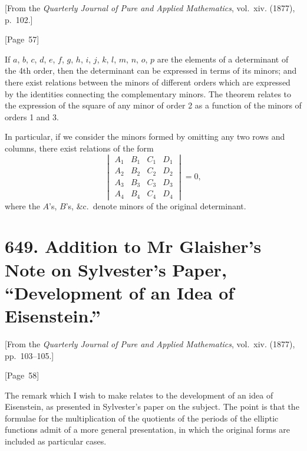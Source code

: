 \documentclass[11pt,a4paper]{article}
\theoremstyle{plain}
\theoremstyle{definition}
\theoremstyle{remark}
\begin{document}
[From the \textit{Quarterly Journal of Pure and Applied Mathematics},
vol.~xiv. (1877), p.~102.]

\begin{center}
[Page~57]
\end{center}

If $a$, $b$, $c$, $d$, $e$, $f$, $g$, $h$, $i$, $j$, $k$, $l$, $m$, $n$, $o$, $p$
are the elements of a determinant of the 4th order, then the determinant
can be expressed in terms of its minors; and there exist relations
between the minors of different orders which are expressed by the
identities connecting the complementary minors. The theorem relates
to the expression of the square of any minor of order 2 as a function
of the minors of orders 1 and 3.

In particular, if we consider the minors formed by omitting any two
rows and columns, there exist relations of the form
\[
\begin{vmatrix}
A_1 & B_1 & C_1 & D_1 \\
A_2 & B_2 & C_2 & D_2 \\
A_3 & B_3 & C_3 & D_3 \\
A_4 & B_4 & C_4 & D_4
\end{vmatrix} = 0,
\]
where the $A$'s, $B$'s, \&c.\ denote minors of the original determinant.


\newpage
\section*{649. Addition to Mr Glaisher's Note on Sylvester's Paper, ``Development of an Idea of Eisenstein.''}

[From the \textit{Quarterly Journal of Pure and Applied Mathematics},
vol.~xiv. (1877), pp.~103--105.]

\begin{center}
[Page~58]
\end{center}

The remark which I wish to make relates to the development of an idea
of Eisenstein, as presented in Sylvester's paper on the subject. The
point is that the formulae for the multiplication of the quotients of
the periods of the elliptic functions admit of a more general
presentation, in which the original forms are included as particular
cases.
\end{document}
